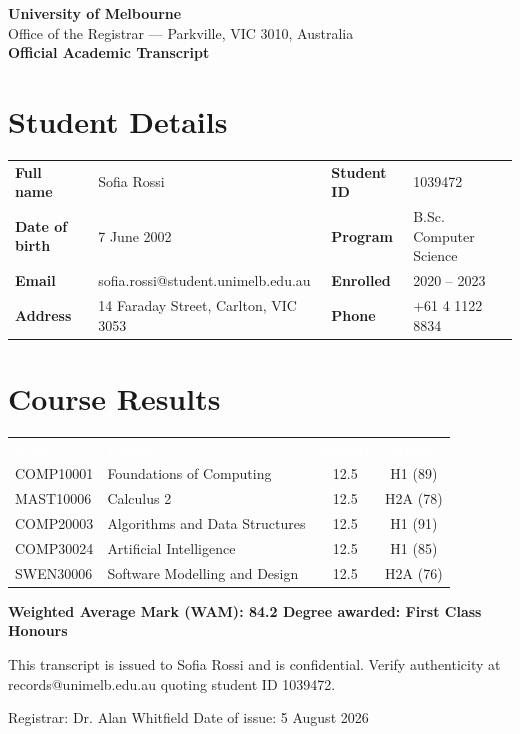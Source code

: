 \documentclass[11pt,a4paper]{article}
\begin{document}
{\Huge\bfseries\color{accent} University of Melbourne}\\[0.2em]
{\normalsize Office of the Registrar — Parkville, VIC 3010, Australia}\\[0.8em]
{\LARGE\bfseries Official Academic Transcript}

\section{Student Details}
\begin{tabularx}{\linewidth}{@{}>{\bfseries}l X >{\bfseries}l X@{}}
Full name & Sofia Rossi & Student ID & 1039472 \\
Date of birth & 7 June 2002 & Program & B.Sc. Computer Science \\
Email & sofia.rossi@student.unimelb.edu.au & Enrolled & 2020 -- 2023 \\
Address & 14 Faraday Street, Carlton, VIC 3053 & Phone & +61 4 1122 8834 \\
\end{tabularx}

\section{Course Results}
\begin{tabularx}{\linewidth}{@{}l X c c@{}}
\rowcolor{accent}\textcolor{white}{\textbf{Code}} & \textcolor{white}{\textbf{Course}} & \textcolor{white}{\textbf{Credits}} & \textcolor{white}{\textbf{Grade}} \\
COMP10001 & Foundations of Computing & 12.5 & H1 (89) \\
\rowcolor{rowgray} MAST10006 & Calculus 2 & 12.5 & H2A (78) \\
COMP20003 & Algorithms and Data Structures & 12.5 & H1 (91) \\
\rowcolor{rowgray} COMP30024 & Artificial Intelligence & 12.5 & H1 (85) \\
SWEN30006 & Software Modelling and Design & 12.5 & H2A (76) \\
\end{tabularx}

\vspace{0.8em}
\textbf{Weighted Average Mark (WAM): 84.2 \quad Degree awarded: First Class Honours}

\vspace{1em}
{\small This transcript is issued to Sofia Rossi and is confidential. Verify authenticity
at records@unimelb.edu.au quoting student ID 1039472.}

\vspace{1.4em}
Registrar: Dr. Alan Whitfield \hfill Date of issue: 5 August 2026
\end{document}

